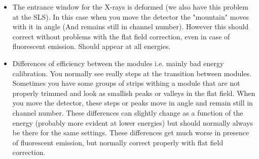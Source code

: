 \begin{itemize}
\item The entrance window for the X-rays is deformed (we also have this problem at the SLS). In this case when you move the detector the "mountain" moves with it in angle (And remains still in channel number). However this should correct without problems with the flat field correction, even in case of fluorescent emission. Should appear at all energies.

\item Differences of efficiency between the modules i.e. mainly bad energy calibration. You normally see really steps at the transition between modules. Sometimes you have some groups of strips withing a module that are not properly trimmed and look as smallish peaks or valleys in the flat field. When you move the detector, these steps or peaks move in angle and remain still in channel number.
These differences can slightly change as a function of the energy (probably more evident at lower energies) but should normally always be there for the same settings.
These differences get much worse in presence of fluorescent emission, but normally correct properly with flat field correction.
\end{itemize}
